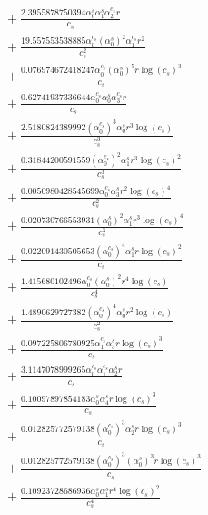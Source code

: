 \documentclass[10pt]{article}
\begin{document}
\begin{align*}
&{}  + \frac{2.3955878750394 \alpha_{0}^s \alpha_{1}^s \alpha_{2}^{c_s} r}{c_{s}} \\
&{}  + \frac{19.557553538885 \alpha_{0}^{c_s} \left(\alpha_{0}^s\right)^{2} \alpha_{1}^{c_s} r^{2}}{c_{s}^{2}} \\
&{}  + \frac{0.076974672418247 \alpha_{0}^{c_s} \left(\alpha_{0}^s\right)^{5} r \log{\left(c_{s} \right)}^{3}}{c_{s}} \\
&{}  + \frac{0.62741937336644 \alpha_{0}^{c_s} \alpha_{0}^s \alpha_{3}^{c_s} r}{c_{s}} \\
&{}  + \frac{2.5180824389992 \left(\alpha_{0}^{c_s}\right)^{3} \alpha_{0}^s r^{3} \log{\left(c_{s} \right)}}{c_{s}^{3}} \\
&{}  + \frac{0.31844200591559 \left(\alpha_{0}^{c_s}\right)^{2} \alpha_{1}^s r^{3} \log{\left(c_{s} \right)}^{2}}{c_{s}^{3}} \\
&{}  + \frac{0.0050980428545699 \alpha_{0}^{c_s} \alpha_{3}^s r^{2} \log{\left(c_{s} \right)}^{4}}{c_{s}^{2}} \\
&{}  + \frac{0.020730766553931 \left(\alpha_{0}^s\right)^{2} \alpha_{1}^s r^{3} \log{\left(c_{s} \right)}^{4}}{c_{s}^{3}} \\
&{}  + \frac{0.022091430505653 \left(\alpha_{0}^{c_s}\right)^{4} \alpha_{1}^s r \log{\left(c_{s} \right)}^{2}}{c_{s}} \\
&{}  + \frac{1.415680102496 \alpha_{0}^{c_s} \left(\alpha_{0}^s\right)^{2} r^{4} \log{\left(c_{s} \right)}}{c_{s}^{4}} \\
&{}  + \frac{1.4890629727382 \left(\alpha_{0}^{c_s}\right)^{4} \alpha_{0}^s r^{2} \log{\left(c_{s} \right)}}{c_{s}^{2}} \\
&{}  + \frac{0.097225806780925 \alpha_{1}^{c_s} \alpha_{3}^s r \log{\left(c_{s} \right)}^{3}}{c_{s}} \\
&{}  + \frac{3.1147078999265 \alpha_{0}^{c_s} \alpha_{1}^{c_s} \alpha_{2}^s r}{c_{s}} \\
&{}  + \frac{0.10097897854183 \alpha_{0}^s \alpha_{4}^s r \log{\left(c_{s} \right)}^{3}}{c_{s}} \\
&{}  + \frac{0.012825772579138 \left(\alpha_{0}^{c_s}\right)^{3} \alpha_{2}^s r \log{\left(c_{s} \right)}^{3}}{c_{s}} \\
&{}  + \frac{0.012825772579138 \left(\alpha_{0}^{c_s}\right)^{3} \left(\alpha_{0}^s\right)^{3} r \log{\left(c_{s} \right)}^{3}}{c_{s}} \\
&{}  + \frac{0.10923728686936 \alpha_{0}^s \alpha_{1}^s r^{4} \log{\left(c_{s} \right)}^{2}}{c_{s}^{4}} \\

\end{align*}
\end{document}

